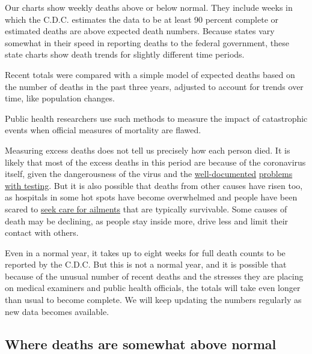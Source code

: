 Our charts show weekly deaths above or below normal. They include weeks
in which the C.D.C. estimates the data to be at least 90 percent
complete or estimated deaths are above expected death numbers. Because
states vary somewhat in their speed in reporting deaths to the federal
government, these state charts show death trends for slightly different
time periods.

Recent totals were compared with a simple model of expected deaths based
on the number of deaths in the past three years, adjusted to account for
trends over time, like population changes.

Public health researchers use such methods to measure the impact of
catastrophic events when official measures of mortality are flawed.

Measuring excess deaths does not tell us precisely how each person died.
It is likely that most of the excess deaths in this period are because
of the coronavirus itself, given the dangerousness of the virus and the
\href{https://www.nytimes3xbfgragh.onion/2020/04/18/health/cdc-coronavirus-lab-contamination-testing.html}{well-documented}
\href{https://www.nytimes3xbfgragh.onion/2020/04/15/us/coronavirus-testing-trump.html}{problems}
\href{https://www.nytimes3xbfgragh.onion/2020/03/28/us/testing-coronavirus-pandemic.html}{with
testing}. But it is also possible that deaths from other causes have
risen too, as hospitals in some hot spots have become overwhelmed and
people have been scared to
\href{https://www.nytimes3xbfgragh.onion/2020/04/06/well/live/coronavirus-doctors-hospitals-emergency-care-heart-attack-stroke.html}{seek
care for ailments} that are typically survivable. Some causes of death
may be declining, as people stay inside more, drive less and limit their
contact with others.

Even in a normal year, it takes up to eight weeks for full death counts
to be reported by the C.D.C. But this is not a normal year, and it is
possible that because of the unusual number of recent deaths and the
stresses they are placing on medical examiners and public health
officials, the totals will take even longer than usual to become
complete. We will keep updating the numbers regularly as new data
becomes available.

\hypertarget{where-deaths-are-somewhat-above-normal}{%
\subsection{Where deaths are somewhat above
normal}\label{where-deaths-are-somewhat-above-normal}}


